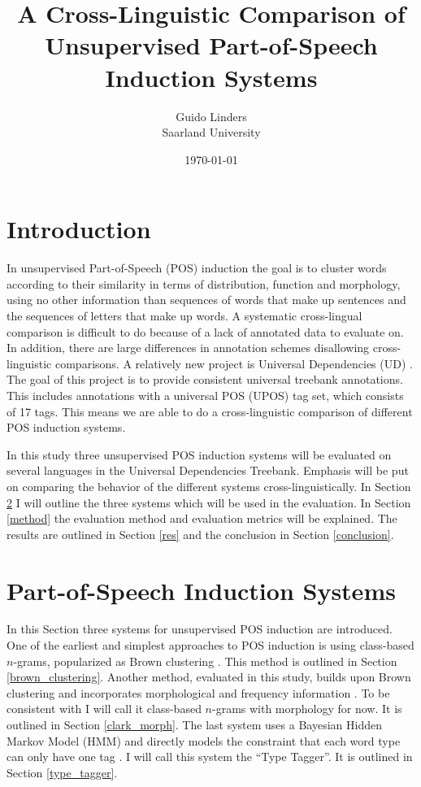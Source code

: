 \documentclass[11pt]{article}
\title{A Cross-Linguistic Comparison of Unsupervised Part-of-Speech Induction Systems}
\author{Guido Linders\\
\large Saarland University}
\date{\today}
\begin{document}
{\selectfont
\maketitle

\section{Introduction}
In unsupervised Part-of-Speech (POS) induction the goal is to cluster words according to their similarity in terms of distribution, function and morphology, using no other information than sequences of words that make up sentences and the sequences of letters that make up words. A systematic cross-lingual comparison is difficult to do because of a lack of annotated data to evaluate on. In addition, there are large differences in annotation schemes disallowing cross-linguistic comparisons. A relatively new project is Universal Dependencies (UD) \citep{11234/1-1827}. The goal of this project is to provide consistent universal treebank annotations. This includes annotations with a universal POS (UPOS) tag set, which consists of 17 tags. This means we are able to do a cross-linguistic comparison of different POS induction systems.

In this study three unsupervised POS induction systems will be evaluated on several languages in the Universal Dependencies Treebank. Emphasis will be put on comparing the behavior of the different systems cross-linguistically. In Section \ref{systems} I will outline the three systems which will be used in the evaluation. In Section \ref{method} the evaluation method and evaluation metrics will be explained. The results are outlined in Section \ref{res} and the conclusion in Section \ref{conclusion}. 

\section{Part-of-Speech Induction Systems}\label{systems}
In this Section three systems for unsupervised POS induction are introduced. One of the earliest and simplest approaches to POS induction is using class-based $n$-grams, popularized as Brown clustering \citep{brown1992class}. This method is outlined in Section \ref{brown_clustering}. Another method, evaluated in this study, builds upon Brown clustering and incorporates morphological and frequency information \citep{clark2003cda}. To be consistent with \cite{christodoulopoulos2010} I will call it class-based $n$-grams with morphology for now. It is outlined in Section \ref{clark_morph}. The last system uses a Bayesian Hidden Markov Model (HMM) and directly models the constraint that each word type can only have one tag \citep{lee2010simple}. I will call this system the ``Type Tagger''. It is outlined in Section \ref{type_tagger}. 

}
\end{document}
